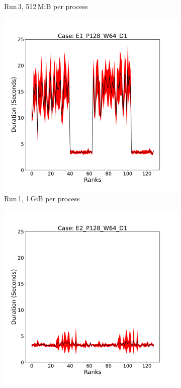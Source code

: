 \begin{figure}
\begin{subfigure}[b]{0.3\textwidth}
         \caption{Run\,3, 512\,MiB per process}
         \label{fig:E3_512_d11}
     \end{subfigure}
     \vfill
          \begin{subfigure}[b]{0.3\textwidth}
         \centering
         \includegraphics[width=\textwidth, height=\textwidth]{figures/deisa1__E1_P128_W64_D1.pdf}
         \caption{Run\,1, 1\,GiB per process}
         \label{fig:E1_1_d11}
     \end{subfigure}
     \hfill
     \begin{subfigure}[b]{0.3\textwidth}
         \centering
         \includegraphics[width=\textwidth, height=\textwidth]{figures/deisa1__E2_P128_W64_D1.pdf}

\end{subfigure}
\end{figure}
